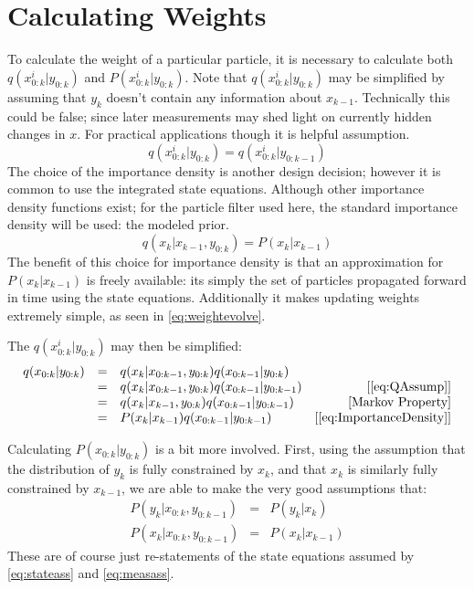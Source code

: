 \section{Calculating Weights}
To calculate the weight of a particular particle, it is necessary to 
calculate both $q(x^i_{0:k} | y_{0:k})$ and $P(x^i_{0:k} | y_{0:k})$.
Note that $q(x^i_{0:k} | y_{0:k})$ may be simplified by assuming that 
$y_k$ doesn't contain any information about $x_{k-1}$. Technically this 
could be false; since later measurements may shed light on currently hidden
changes in $x$. For practical applications though it is helpful assumption.
\begin{equation}
q(x^i_{0:k} | y_{0:k}) = q(x^i_{0:k} | y_{0:k-1})
\label{eq:QAssump}
\end{equation}
The choice of the importance density is another design decision; however
it is common to use the integrated state equations. 
Although other importance density functions exist; for the particle filter
used here, the standard importance density will be used: the modeled
prior.
\begin{equation}
q(x_k | x_{k-1}, y_{0:k}) =  P(x_k | x_{k-1})
\label{eq:ImportanceDensity}
\end{equation}
The benefit of this choice for importance density is that an approximation for
$P(x_k | x_{k-1})$ is freely available: its simply the set of particles propagated
forward in time using the state equations. Additionally it makes
updating weights extremely simple, as seen in \autoref{eq:weightevolve}.

The $q(x^i_{0:k} | y_{0:k})$ may then be simplified:
\begin{equation}
\begin{array}{cclr}
q(x_{0:k} | y_{0:k}) & = & q(x_k | x_{0:k-1}, y_{0:k})q(x_{0:k-1} | y_{0:k}) &  \\
& = & q(x_k | x_{0:k-1}, y_{0:k})q(x_{0:k-1} | y_{0:k-1})  & \text{[\autoref{eq:QAssump}]} \\
& = & q(x_k | x_{k-1}, y_{0:k})q(x_{0:k-1} | y_{0:k-1})  & \text{[Markov Property]}\\
& = & P(x_k | x_{k-1})q(x_{0:k-1} | y_{0:k-1})  & \text{[\autoref{eq:ImportanceDensity}]}
\end{array}
\end{equation}

Calculating $P(x_{0:k} | y_{0:k})$ is a bit more involved. 
First, using the assumption that the distribution of $y_k$ is 
fully constrained by $x_k$, and that $x_k$ is similarly fully 
constrained by $x_{k-1}$, we are able to make the very good assumptions that:
\begin{eqnarray}
P(y_k | x_{0:k}, y_{0:k-1}) &=& P(y_k | x_k) \nonumber \\
P(x_k | x_{0:k}, y_{0:k-1}) &=& P(x_k | x_{k-1})
\label{eq:MarkovProperty}
\end{eqnarray}
These are of course just re-statements of the state equations assumed by \autoref{eq:stateass}
and \autoref{eq:measass}.

